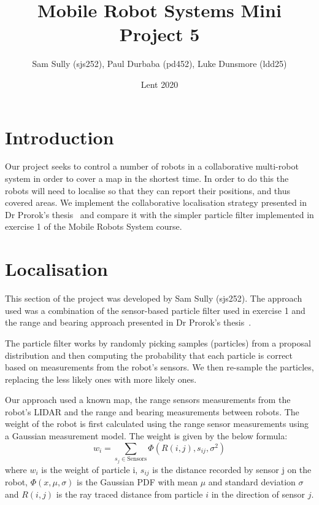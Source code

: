 \documentclass[10pt,a4paper]{article}
\begin{document}
\twocolumn
\title{Mobile Robot Systems Mini Project 5}
\author{Sam Sully (sjs252), Paul Durbaba (pd452), Luke Dunsmore (ldd25)}
\date{Lent 2020}
\maketitle
\section{Introduction}
Our project seeks to control a number of robots in a collaborative multi-robot system in order to cover a map in the shortest time. In order to do this the robots will need to localise so that they can report their positions, and thus covered areas. We implement the collaborative localisation strategy presented in Dr Prorok's thesis~\cite{prorok} and compare it with the simpler particle filter implemented in exercise 1 of the Mobile Robots System course.
\section{Localisation}
This section of the project was developed by Sam Sully (sjs252). The approach used was a combination of the sensor-based particle filter used in exercise 1 and the range and bearing approach presented in Dr Prorok's thesis~\cite{prorok}.

The particle filter works by randomly picking samples (particles) from a proposal distribution and then computing the probability that each particle is correct based on measurements from the robot's sensors. We then re-sample the particles, replacing the less likely ones with more likely ones.

Our approach used a known map, the range sensors measurements from the robot's LIDAR and the range and bearing measurements between robots. The weight of the robot is first calculated using the range sensor measurements using a Gaussian measurement model. The weight is given by the below formula:
\[
	w_i = \sum_{s_{j} \in \mathrm{Sensors}}\Phi(R(i,j), s_{ij}, \sigma^2)
\]
where $w_i$ is the weight of particle i, $s_{ij}$ is the distance recorded by sensor j on the robot, $\Phi(x,\mu,\sigma)$ is the Gaussian PDF with mean $\mu$ and standard deviation $\sigma$ and $R(i,j)$ is the ray traced distance from particle $i$ in the direction of sensor $j$.
\end{document}
